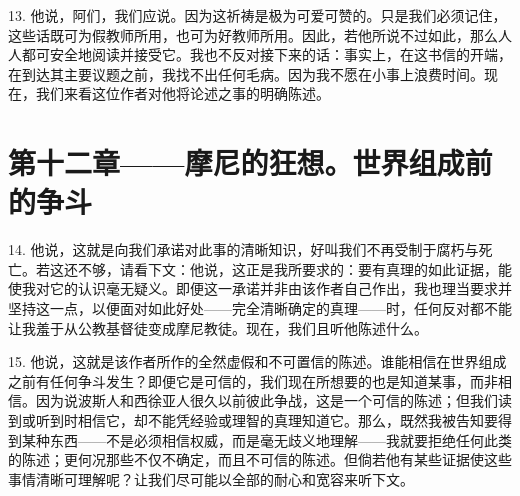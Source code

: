 13. 他说，阿们，我们应说。因为这祈祷是极为可爱可赞的。只是我们必须记住，这些话既可为假教师所用，也可为好教师所用。因此，若他所说不过如此，那么人人都可安全地阅读并接受它。我也不反对接下来的话：事实上，在这书信的开端，在到达其主要议题之前，我找不出任何毛病。因为我不愿在小事上浪费时间。现在，我们来看这位作者对他将论述之事的明确陈述。\par


\section{第十二章——摩尼的狂想。世界组成前的争斗}

14. 他说，这就是向我们承诺对此事的清晰知识，好叫我们不再受制于腐朽与死亡。若这还不够，请看下文：他说，这正是我所要求的：要有真理的如此证据，能使我对它的认识毫无疑义。即便这一承诺并非由该作者自己作出，我也理当要求并坚持这一点，以便面对如此好处——完全清晰确定的真理——时，任何反对都不能让我羞于从公教基督徒变成摩尼教徒。现在，我们且听他陈述什么。\par

15. 他说，这就是该作者所作的全然虚假和不可置信的陈述。谁能相信在世界组成之前有任何争斗发生？即便它是可信的，我们现在所想要的也是知道某事，而非相信。因为说波斯人和西徐亚人很久以前彼此争战，这是一个可信的陈述；但我们读到或听到时相信它，却不能凭经验或理智的真理知道它。那么，既然我被告知要得到某种东西——不是必须相信权威，而是毫无歧义地理解——我就要拒绝任何此类的陈述；更何况那些不仅不确定，而且不可信的陈述。但倘若他有某些证据使这些事情清晰可理解呢？让我们尽可能以全部的耐心和宽容来听下文。\par


